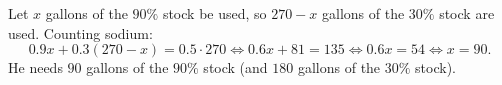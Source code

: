 Let $x$ gallons of the $90\%$ stock be used, so $270-x$ gallons of the $30\%$ stock are used. Counting sodium:
\[
0.9x+0.3(270-x)=0.5\cdot270\iff 0.6x+81=135\iff 0.6x=54\iff x=90 .
\]
He needs $\boxed{90}$ gallons of the $90\%$ stock (and $180$ gallons of the $30\%$ stock).
